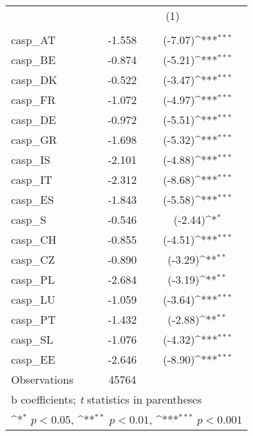 {
\def\sym#1{\ifmmode^{#1}\else\(^{#1}\)\fi}
\begin{tabular}{l*{1}{cc}}
\hline\hline
                    &\multicolumn{2}{c}{(1)}           \\
                    &\multicolumn{2}{c}{}              \\
\hline
casp\_AT             &      -1.558&     (-7.07)\sym{***}\\
casp\_BE             &      -0.874&     (-5.21)\sym{***}\\
casp\_DK             &      -0.522&     (-3.47)\sym{***}\\
casp\_FR             &      -1.072&     (-4.97)\sym{***}\\
casp\_DE             &      -0.972&     (-5.51)\sym{***}\\
casp\_GR             &      -1.698&     (-5.32)\sym{***}\\
casp\_IS             &      -2.101&     (-4.88)\sym{***}\\
casp\_IT             &      -2.312&     (-8.68)\sym{***}\\
casp\_ES             &      -1.843&     (-5.58)\sym{***}\\
casp\_S              &      -0.546&     (-2.44)\sym{*}  \\
casp\_CH             &      -0.855&     (-4.51)\sym{***}\\
casp\_CZ             &      -0.890&     (-3.29)\sym{**} \\
casp\_PL             &      -2.684&     (-3.19)\sym{**} \\
casp\_LU             &      -1.059&     (-3.64)\sym{***}\\
casp\_PT             &      -1.432&     (-2.88)\sym{**} \\
casp\_SL             &      -1.076&     (-4.32)\sym{***}\\
casp\_EE             &      -2.646&     (-8.90)\sym{***}\\
\hline
Observations        &       45764&                     \\
\hline\hline
\multicolumn{3}{l}{\footnotesize b coefficients; \textit{t} statistics in parentheses}\\
\multicolumn{3}{l}{\footnotesize \sym{*} \(p<0.05\), \sym{**} \(p<0.01\), \sym{***} \(p<0.001\)}\\
\end{tabular}
}
